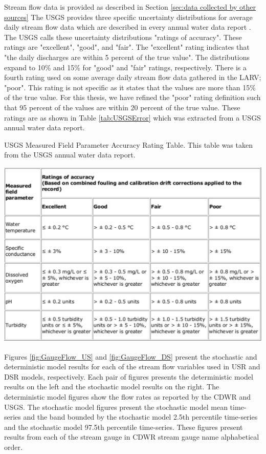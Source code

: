 \begin{linenumbers}
Stream flow data is provided as described in Section \ref{sec:data collected by other sources}  The USGS provides three specific uncertainty distributions for average daily stream flow data which are described in every annual water data report \parencite{USGS2006NWIS, USGS2007NWIS, USGS2008NWIS, USGS2009NWIS, USGS2010NWIS, USGS2011NWIS, USGS2012NWIS}.  The USGS calls these uncertainty distributions "ratings of accuracy".  These ratings are "excellent", "good", and "fair".  The "excellent" rating indicates that "the daily discharges are within 5 percent of the true value".  The distributions expand to 10\% and 15\% for "good" and "fair" ratings, respectively.  There is a fourth rating used on some average daily stream flow data gathered in the LARV; "poor".  This rating is not specific as it states that the values are more than 15\% of the true value.  For this thesis, we have refined the "poor" rating definition such that 95 percent of the values are within 20 percent of the true value.  These ratings are as shown in Table \ref{tab:USGSError} which was extracted from a USGS annual water data report.

\begin{table}[htbp]
	\caption[USGS Measured Field Parameter Accuracy Rating Table.]{USGS Measured Field Parameter Accuracy Rating Table.  This table was taken from the USGS annual water data report. }
	\label{tab:USGSError}
	\includegraphics[width=6in]{"Figures/USGS_error_table"}
\end{table}

Figures \ref{fig:GaugeFlow_US} and \ref{fig:GaugeFlow_DS} present the stochastic and deterministic model results for each of the stream flow variables used in USR and DSR models, respectively.  Each pair of figures presents the deterministic model results on the left and the stochastic model results on the right.  The deterministic model figures show the flow rates as reported by the CDWR and USGS.  The stochastic model figures present the stochastic model mean time-series and the band bounded by the stochastic model 2.5th percentile time-series and the stochastic model 97.5th percentile time-series.  These figures present results from each of the stream gauge in CDWR stream gauge name alphabetical order.


\end{linenumbers}
